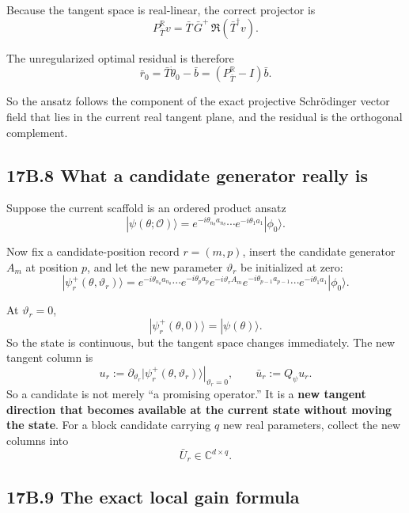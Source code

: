 \documentclass[11pt]{article}
\begin{document}
Because the tangent space is real-linear, the correct projector is
\[
P_{\bar T}^{\mathbb R}v
=
\bar T\,\bar G^+\,\Re(\bar T^\dagger v).
\]

The unregularized optimal residual is therefore
\[
\bar r_0
=
\bar T\dot\theta_0-\bar b
=
\left(P_{\bar T}^{\mathbb R}-I\right)\bar b.
\]

So the ansatz follows the component of the exact projective Schrödinger vector field that lies in the current real tangent plane, and the residual is the orthogonal complement.

\subsection*{17B.8 What a candidate generator really is}


Suppose the current scaffold is an ordered product ansatz
\[
|\psi(\theta;\mathcal O)\rangle
=
e^{-i\theta_{n_\theta} a_{n_\theta}}\cdots e^{-i\theta_1 a_1}|\phi_0\rangle.
\]

Now fix a candidate-position record $r=(m,p)$, insert the candidate generator $A_m$ at position $p$, and let the new parameter $\vartheta_r$ be initialized at zero:
\[
|\psi_r^+(\theta,\vartheta_r)\rangle
=
e^{-i\theta_{n_\theta} a_{n_\theta}}\cdots e^{-i\theta_p a_p}
e^{-i\vartheta_r A_m}
e^{-i\theta_{p-1}a_{p-1}}\cdots e^{-i\theta_1 a_1}|\phi_0\rangle.
\]

At $\vartheta_r=0$,
\[
|\psi_r^+(\theta,0)\rangle=|\psi(\theta)\rangle.
\]
So the state is continuous, but the tangent space changes immediately. The new tangent column is
\[
u_r:=\left.\partial_{\vartheta_r}|\psi_r^+(\theta,\vartheta_r)\rangle\right|_{\vartheta_r=0},
\qquad
\bar u_r:=Q_\psi u_r.
\]
So a candidate is not merely “a promising operator.” It is a \textbf{new tangent direction that becomes available at the current state without moving the state}. For a block candidate carrying $q$ new real parameters, collect the new columns into
\[
\bar U_r\in\mathbb C^{d\times q}.
\]

\subsection*{17B.9 The exact local gain formula}
\end{document}
